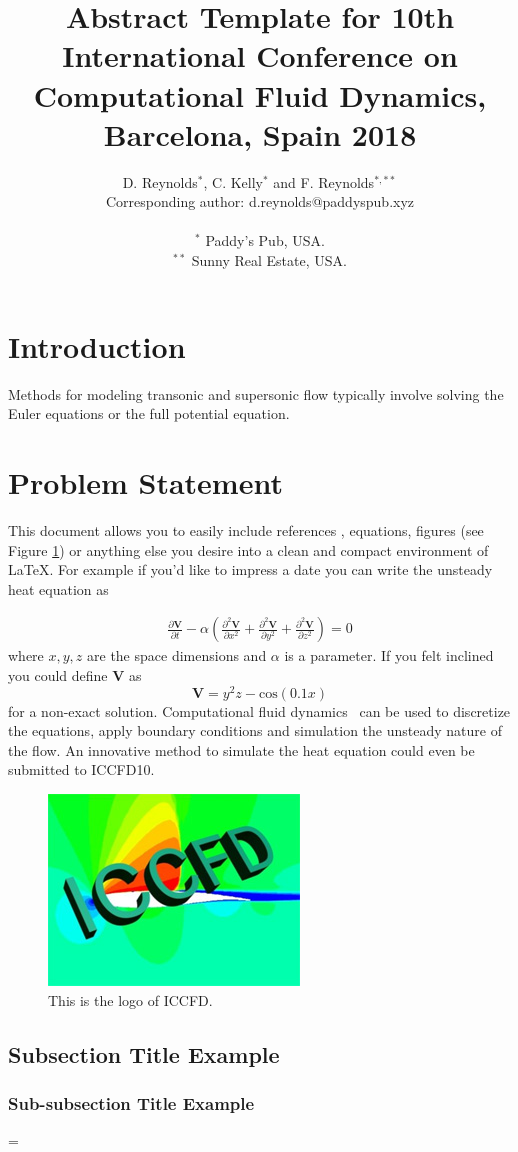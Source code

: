 \documentclass[10pt]{article}
\title{
\bf Abstract Template for 10th International Conference on Computational
Fluid Dynamics, Barcelona, Spain 2018
}
\author{
D. Reynolds$^{*}$, C. Kelly$^{*}$ and F. Reynolds$^{*,**}$\\
Corresponding author: d.reynolds@paddyspub.xyz\\\\
$^{*}$ Paddy's Pub, USA.\\
$^{**}$ Sunny Real Estate, USA.
}
\date{}
\newcommand{\laeq}[1]{\label{eq:#1}}
\newcommand{\figu}[1]{\ref{fig:#1}}
\newcommand{\lafi}[1]{\label{fig:#1}}
\begin{document}
\maketitle
\afterpage{\fancyhead{}}

\centerline{
}
\vskip0.5cm

\section{Introduction}

Methods for modeling transonic and supersonic flow typically involve solving the Euler equations or the full potential equation. 


\section{Problem Statement}
This document allows you to easily include references \cite{book,journalpaper}, equations, figures (see Figure \figu{logo}) or anything else you
desire into a clean and compact environment of \LaTeX.  For example if you'd like to impress a date you can write
the unsteady heat equation as

\begin{eqnarray}
\frac{\partial \mathbf{V}}{\partial t} - \alpha \left( \frac{\partial^2 \mathbf{V}}{\partial x^2} +
       \frac{\partial^2 \mathbf{V}}{\partial y^2} +
       \frac{\partial^2 \mathbf{V}}{\partial z^2} \right)
= 0
\laeq{heat}
\end{eqnarray}
where $x, y, z$ are the space dimensions and $\alpha$ is a parameter.  If you felt inclined you could define $\mathbf{V}$ as
%
$$\mathbf{V} = y^2 z - \text{cos}(0.1 x)$$
%
for a non-exact solution.  Computational fluid dynamics~\cite{paper} can be used to discretize the equations, apply boundary conditions and 
simulation the unsteady nature of the flow.  An innovative method to simulate the heat equation could even be submitted to ICCFD10.

\begin{figure}[t]
  \centering
  \includegraphics[height=2.0in]{exampleFigure.jpg}
  \caption{This is the logo of ICCFD.}
  \lafi{logo}
\end{figure}


\subsection{Subsection Title Example}

\subsubsection{Sub-subsection Title Example}



\bibspacing=


\end{document}
